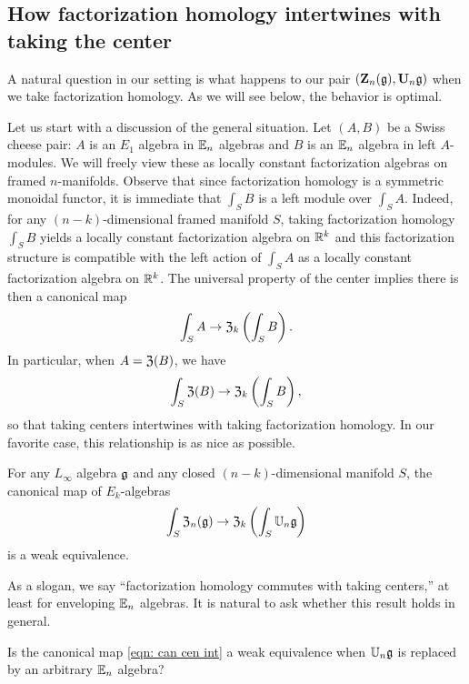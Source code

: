\documentclass[11pt]{amsart}
\numberwithin{equation}{section}
\begin{document}
\subsection{How factorization homology intertwines with taking the center}

A natural question in our setting is what happens to our pair $(\mathbf Z_n(\mathfrak g), \mathbf U_n \mathfrak g)$ when we take factorization homology.
As we will see below, the behavior is optimal.

Let us start with a discussion of the general situation.
Let $(A,B)$ be a Swiss cheese pair: $A$ is an $E_1$ algebra in $\mathbb E_n$ algebras and $B$ is an $\mathbb E_n$ algebra in left $A$-modules. 
We will freely view these as locally constant factorization algebras on framed $n$-manifolds.
Observe that since factorization homology is a symmetric monoidal functor, 
it is immediate that $\int_S B$ is a left module over $\int_S A$.
Indeed, for any $(n-k)$-dimensional framed manifold $S$, 
taking factorization homology $\int_S B$ yields a locally constant factorization algebra on $\mathbb R^k$ 
and this factorization structure is compatible with the left action of $\int_S A$ as a locally constant factorization algebra on $\mathbb R^k$.
The universal property of the center implies there is then a canonical map
\[
\int_{S} A \to \mathfrak Z_k \left( \int_S B \right).
\]
In particular, when $A = \mathfrak Z(B)$, we have
\begin{equation}
\label{eqn: can cen int}
\int_{S} \mathfrak Z(B) \to \mathfrak Z_k \left( \int_S B \right),
\end{equation}
so that taking centers intertwines with taking factorization homology.
In our favorite case, this relationship is as nice as possible.

\begin{prp}
\label{prp: z commutes with int}
For any $L_\infty$ algebra $\mathfrak g$ and any closed $(n-k)$-dimensional manifold $S$,
the canonical map of $E_k$-algebras
\[
\int_{S} \mathfrak Z_n(\mathfrak g) \to \mathfrak Z_k \left( \int_S \mathbb U_n \mathfrak g \right)
\]
is a weak equivalence.
\end{prp}

As a slogan, we say ``factorization homology commutes with taking centers,'' 
at least for enveloping $\mathbb E_n$ algebras.
It is natural to ask whether this result holds in general.

\begin{qtn}
Is the canonical map \eqref{eqn: can cen int} a weak equivalence when $\mathbb U_n \mathfrak g$ is replaced by an arbitrary $\mathbb E_n$ algebra?
\end{qtn}
\end{document}
